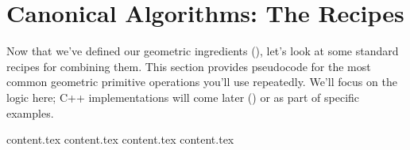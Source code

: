 \clearpage
\section{Canonical Algorithms: The Recipes}
\label{sec:A.2}

Now that we've defined our geometric ingredients (), let's look at some standard recipes for combining them. This section provides pseudocode for the most common geometric primitive operations you'll use repeatedly. We'll focus on the logic here; C++ implementations will come later () or as part of specific examples.

{content.tex}
{content.tex}
{content.tex}
{content.tex}